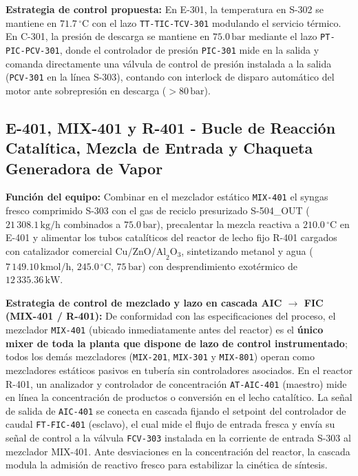 \documentclass[10pt,letterpaper]{article}
\begin{document}
\textbf{Estrategia de control propuesta:} En E-301, la temperatura en S-302 se mantiene en $71.7\,^\circ\text{C}$ con el lazo \texttt{TT-TIC-TCV-301} modulando el servicio térmico. En C-301, la presión de descarga se mantiene en $75.0\,\text{bar}$ mediante el lazo \texttt{PT-PIC-PCV-301}, donde el controlador de presión \texttt{PIC-301} mide en la salida y comanda directamente una válvula de control de presión instalada a la salida (\texttt{PCV-301} en la línea S-303), contando con interlock de disparo automático del motor ante sobrepresión en descarga ($>80\,\text{bar}$).

\subsection{E-401, MIX-401 y R-401 - Bucle de Reacción Catalítica, Mezcla de Entrada y Chaqueta Generadora de Vapor}
\textbf{Función del equipo:} Combinar en el mezclador estático \texttt{MIX-401} el syngas fresco comprimido S-303 con el gas de reciclo presurizado S-504\_OUT ($21\,308.1\,\text{kg/h}$ combinados a $75.0\,\text{bar}$), precalentar la mezcla reactiva a $210.0\,^\circ\text{C}$ en E-401 y alimentar los tubos catalíticos del reactor de lecho fijo R-401 cargados con catalizador comercial $\text{Cu/ZnO/Al}_2\text{O}_3$, sintetizando metanol y agua ($7\,149.10\,\text{kmol/h}$, $245.0\,^\circ\text{C}$, $75\,\text{bar}$) con desprendimiento exotérmico de $12\,335.36\,\text{kW}$.

\textbf{Estrategia de control de mezclado y lazo en cascada AIC $\to$ FIC (MIX-401 / R-401):} De conformidad con las especificaciones del proceso, el mezclador \texttt{MIX-401} (ubicado inmediatamente antes del reactor) es el \textbf{único mixer de toda la planta que dispone de lazo de control instrumentado}; todos los demás mezcladores (\texttt{MIX-201}, \texttt{MIX-301} y \texttt{MIX-801}) operan como mezcladores estáticos pasivos en tubería sin controladores asociados. En el reactor R-401, un analizador y controlador de concentración \texttt{AT-AIC-401} (maestro) mide en línea la concentración de productos o conversión en el lecho catalítico. La señal de salida de \texttt{AIC-401} se conecta en cascada fijando el setpoint del controlador de caudal \texttt{FT-FIC-401} (esclavo), el cual mide el flujo de entrada fresca y envía su señal de control a la válvula \texttt{FCV-303} instalada en la corriente de entrada S-303 al mezclador MIX-401. Ante desviaciones en la concentración del reactor, la cascada modula la admisión de reactivo fresco para estabilizar la cinética de síntesis.
\end{document}
